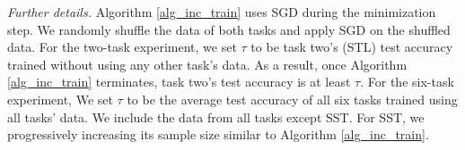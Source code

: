 \medskip
\noindent\textit{Further details.}
Algorithm \ref{alg_inc_train} uses SGD during the minimization step.
We randomly shuffle the data of both tasks and apply SGD on the shuffled data.
For the two-task experiment, we set $\tau$ to be task two's (STL) test accuracy trained without using any other task's data.
As a result, once Algorithm \ref{alg_inc_train} terminates, task two's test accuracy is at least $\tau$.
For the six-task experiment, We set $\tau$ to be the average test accuracy of all six tasks trained using all tasks' data.
We include the data from all tasks except SST. For SST, we progressively increasing its sample size similar to Algorithm \ref{alg_inc_train}.





